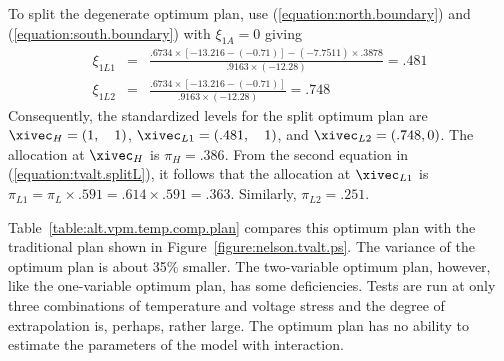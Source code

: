 \begin{example}
To split the degenerate optimum plan, use (\ref{equation:north.boundary})
and (\ref{equation:south.boundary}) with
$\xi_{1A}=0$ giving
\begin{eqnarray*}
\xi_{1L1}&=&
\frac{
.6734 \times [-13.216-(-0.71)]- (-7.7511)\times .3878
     }
     {
.9163\times (-12.28)
     }=.481
\\
\xi_{1L2}&=&
\frac{
.6734 \times [-13.216-(-0.71)]
     }
     {
.9163 \times (-12.28)
     }=.748
\end{eqnarray*}
Consequently, the standardized levels for the
split optimum plan are
$\xivec_{H}=(1,\quad 1)$,
$\xivec_{L1}=(.481,\quad 1)$, and
$\xivec_{L2}=(.748,0)$. 
The allocation at $\xivec_{H}$ is $\pi_{H}=.386$. 
From the second equation in (\ref{equation:tvalt.splitL}),
it follows that the allocation at $\xivec_{L1}$ is
$\pi_{L1}= \pi_{L} \times .591=.614 \times .591 =.363$.
Similarly, $\pi_{L2}=.251$.

Table~\ref{table:alt.vpm.temp.comp.plan} compares this optimum plan
with the traditional plan shown in
Figure~\ref{figure:nelson.tvalt.ps}.  The variance of the optimum
plan is about 35\% smaller.  
The two-variable optimum plan, however, like the
one-variable optimum plan, has some deficiencies. Tests are run at
only three combinations of temperature and voltage stress and the
degree of extrapolation is, perhaps, rather large.
The optimum plan has no ability to estimate the parameters of
the model with interaction.
\end{example}

